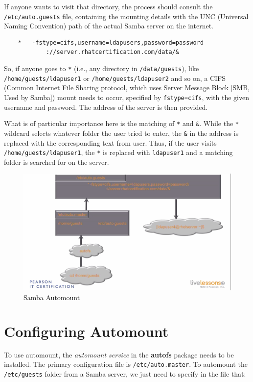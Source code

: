 \documentclass{report}
\begin{document}
	\noindent
	If anyone wants to visit that directory, the process should consult the \verb|/etc/auto.guests| file, containing the mounting details with the UNC (Universal Naming Convention) path of the actual Samba server on the internet. 
	
	\begin{verbatim}
	*	-fstype=cifs,username=ldapusers,password=password 
			://server.rhatcertification.com/data/&
	\end{verbatim}
	
	\noindent
	So, if anyone goes to \verb|*| (i.e., any directory in \verb|/data/guests|), like \verb|/home/guests/ldapuser1| or \verb|/home/guests/ldapuser2| and so on, a CIFS (Common Internet File Sharing protocol, which uses Server Message Block [SMB, Used by Samba]) mount needs to occur, specified by \verb|fstype=cifs|, with the given username and password. The address of the server is then provided. 
	
	What is of particular importance here is the matching of \verb|*| and \verb|&|. While the \verb|*| wildcard selects whatever folder the user tried to enter, the \verb|&| in the address is replaced with the corresponding text from user. Thus, if the user visits \verb|/home/guests/ldapuser1|, the \verb|*| is replaced with \verb|ldapuser1| and a matching folder is searched for on the server. 
	
	\begin{figure}[H]
		\centering
		\includegraphics[width=0.9\linewidth]{"1.7.b Samba Automount"}
		\caption{Samba Automount}
		\label{fig:1}
	\end{figure}
	
	
	\section{Configuring Automount}
	To use automount, the \textit{automount service} in the \textbf{autofs} package needs to be installed. The primary configuration file is \verb|/etc/auto.master|. To automount the \verb|/etc/guests| folder from a Samba server, we just need to specify in the file that:
	
\end{document}

